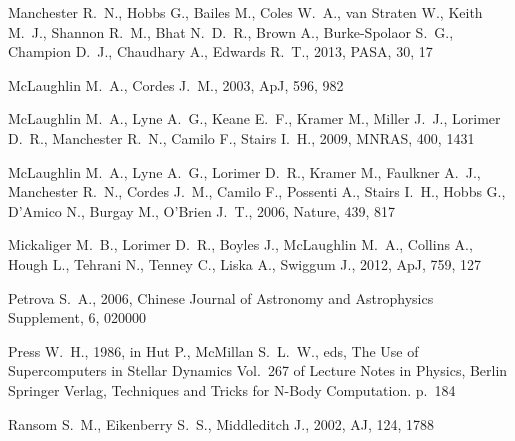 \documentclass[fleqn,usenatbib]{mnras}
\begin{document}
\begin{thebibliography}{99}
{Manchester} R.~N., {Hobbs} G., {Bailes} M., {Coles} W.~A., {van Straten}
  W., {Keith} M.~J., {Shannon} R.~M., {Bhat} N.~D.~R., {Brown} A.,
  {Burke-Spolaor} S.~G., {Champion} D.~J., {Chaudhary} A., {Edwards}
  R.~T., 2013, PASA, 30, 17

{McLaughlin} M.~A., {Cordes} J.~M., 2003, ApJ, 596, 982

{McLaughlin} M.~A., {Lyne} A.~G., {Keane} E.~F., {Kramer} M., {Miller}
  J.~J., {Lorimer} D.~R., {Manchester} R.~N., {Camilo} F., {Stairs}
  I.~H., 2009, MNRAS, 400, 1431

{McLaughlin} M.~A., {Lyne} A.~G., {Lorimer} D.~R., {Kramer} M., {Faulkner}
  A.~J., {Manchester} R.~N., {Cordes} J.~M., {Camilo} F., {Possenti} A.,
  {Stairs} I.~H., {Hobbs} G., {D'Amico} N., {Burgay} M., {O'Brien} J.~T.,
   2006, Nature, 439, 817

{Mickaliger} M.~B., {Lorimer} D.~R., {Boyles} J., {McLaughlin} M.~A.,
  {Collins} A., {Hough} L., {Tehrani} N., {Tenney} C., {Liska} A.,
  {Swiggum} J., 2012, ApJ, 759, 127

{Petrova} S.~A., 2006, Chinese Journal of Astronomy and Astrophysics
  Supplement, 6, 020000

{Press} W.~H., 1986, in {Hut} P., {McMillan} S.~L.~W., eds, The Use of
  Supercomputers in Stellar Dynamics Vol.~267 of Lecture Notes in Physics,
  Berlin Springer Verlag, {Techniques and Tricks for N-Body Computation}. p.~184

{Ransom} S.~M., {Eikenberry} S.~S., {Middleditch} J., 2002, AJ, 124, 1788


\end{thebibliography}
\end{document}
